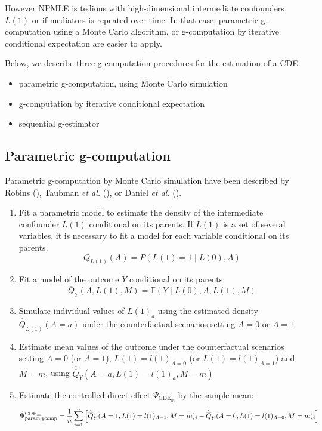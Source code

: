 \documentclass[
]{book}
\providecommand{\tightlist}{%
  \setlength{\itemsep}{0pt}\setlength{\parskip}{0pt}}
\begin{document}
However NPMLE is tedious with high-dimensional intermediate confounders \(L(1)\) or if mediators is repeated over time. In that case, parametric g-computation using a Monte Carlo algorithm, or g-computation by iterative conditional expectation are easier to apply.

Below, we describe three g-computation procedures for the estimation of a CDE:

\begin{itemize}
\tightlist
\item
  parametric g-computation, using Monte Carlo simulation
\item
  g-computation by iterative conditional expectation
\item
  sequential g-estimator
\end{itemize}

\subsection{Parametric g-computation}\label{ChapGcomp-CDE-param}

Parametric g-computation by Monte Carlo simulation have been described by Robins (), Taubman \emph{et al.} (), or Daniel \emph{et al.} ().

\begin{enumerate}
\def\labelenumi{\arabic{enumi}.}
\item
  Fit a parametric model to estimate the density of the intermediate confounder \(L(1)\) conditional on its parents. If \(L(1)\) is a set of several variables, it is necessary to fit a model for each variable conditional on its parents.
  \begin{equation}
    Q_{L(1)}(A) = P(L(1)=1 \mid L(0),A)
  \end{equation}
\item
  Fit a model of the outcome \(Y\) conditional on its parents:
  \begin{equation}
    \overline{Q}_Y(A,L(1),M) = \mathbb{E}\left(Y \mid L(0),A,L(1),M \right)
  \end{equation}
\item
  Simulate individual values of \(L(1)_a\) using the estimated density \(\hat{Q}_{L(1)}(A=a)\) under the counterfactual scenarios setting \(A=0\) or \(A=1\)
\item
  Estimate mean values of the outcome under the counterfactual scenarios setting \(A=0\) (or \(A=1\)), \(L(1)=l(1)_{A=0}\) (or \(L(1)=l(1)_{A=1}\)) and \(M=m\), using \(\hat{\overline{Q}}_Y(A=a,L(1)=l(1)_a,M=m)\)
\item
  Estimate the controlled direct effect \(\Psi_{\text{CDE}_m}\) by the sample mean:
  \begin{equation}
    \small \hat{\Psi}^{\text{CDE}_m}_{\text{param.gcomp}} = \frac{1}{n} \sum_{i=1}^n \left[ \hat{\overline{Q}}_Y(A=1,L(1)=l(1)_{A=1},M=m)_i - \hat{\overline{Q}}_Y(A=0,L(1)=l(1)_{A=0},M=m)_i \right]
  \end{equation}
\end{enumerate}
\end{document}
